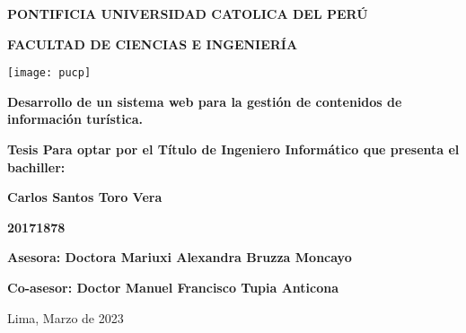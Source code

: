 \begin{titlepage}
    \begin{center}
        \vspace*{1cm}
        \Large
        \textbf{PONTIFICIA UNIVERSIDAD CATOLICA DEL PERÚ}

        \vspace{0.5cm}
        \textbf{FACULTAD DE CIENCIAS E INGENIERÍA}

        \vspace{0.5cm}
        \texttt{[image: pucp]}

        \vspace{1.5cm}
        \textbf{Desarrollo de un sistema web para la gestión de contenidos de información turística.}

        \normalsize
        \vspace{3.5cm}
        \textbf{Tesis Para optar por el Título de Ingeniero Informático que presenta el bachiller:}

        \Large
        \vspace{1.5cm}
        \textbf{Carlos Santos Toro Vera}

        \vspace{0.3cm}
        \textbf{20171878}

        \vspace{3cm}
        \textbf{Asesora: Doctora Mariuxi Alexandra Bruzza Moncayo}

        \textbf{Co-asesor: Doctor Manuel Francisco Tupia Anticona}

        \normalsize
        \vspace{3cm}
        {Lima, Marzo de 2023}
    \end{center}
\end{titlepage}

